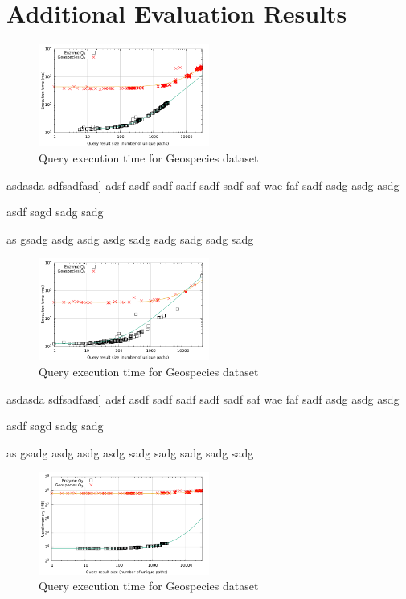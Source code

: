 \section{Additional Evaluation Results}\label{sec:evlaDetails}

\begin{figure}[h]
  \begin{center}
    \includegraphics[width=0.5\textwidth]{data/time_per_paths_NT.pdf}
    \caption{Query execution time for Geospecies dataset}
    \label{fig:time_per_paths_NT}
  \end{center}
\end{figure}

asdasda sdfsadfasd] adsf asdf sadf sadf sadf sadf saf wae faf sadf asdg asdg asdg 

 asdf sagd sadg sadg 

 as gsadg asdg asdg asdg sadg sadg sadg sadg sadg 

\begin{figure}[h]
  \begin{center}
    \includegraphics[width=0.5\textwidth]{data/time_per_paths_SCO.pdf}
    \caption{Query execution time for Geospecies dataset}
    \label{fig:time_per_paths_SCO}
  \end{center}
\end{figure}

asdasda sdfsadfasd] adsf asdf sadf sadf sadf sadf saf wae faf sadf asdg asdg asdg 

 asdf sagd sadg sadg 

 as gsadg asdg asdg asdg sadg sadg sadg sadg sadg 

\begin{figure}[h]
  \begin{center}
    \includegraphics[width=0.5\textwidth]{data/mem_per_paths_NT.pdf}
    \caption{Query execution time for Geospecies dataset}
    \label{fig:mem_per_paths_NT}
  \end{center}
\end{figure}

